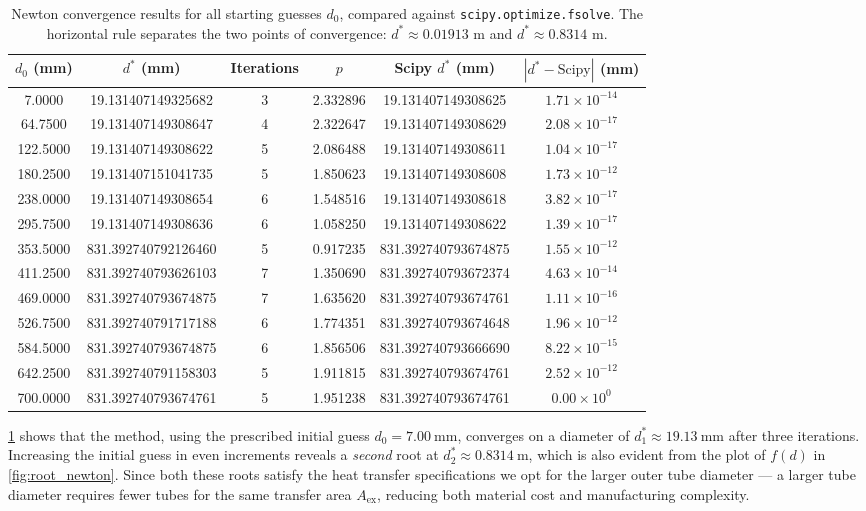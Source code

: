 \documentclass[11pt, a4paper]{article}
\theoremstyle{definition}
\begin{document}
\begin{table}[h!]
\small
\centering
\begin{tabular}{cccccc}
\hline
\textbf{$d_0$ (mm)} & \textbf{$d^*$ (mm)} & \textbf{Iterations} & \textbf{$p$} & \textbf{Scipy $d^*$ (mm)} & \textbf{$|d^* - \text{Scipy}|$ (mm)} \\
\hline
  7.0000  &  19.131407149325682 & 3 & 2.332896 &  19.131407149308625 & $1.71\times 10^{-14}$ \\
 64.7500  &  19.131407149308647 & 4 & 2.322647 &  19.131407149308629 & $2.08\times 10^{-17}$ \\
122.5000  &  19.131407149308622 & 5 & 2.086488 &  19.131407149308611 & $1.04\times 10^{-17}$ \\
180.2500  &  19.131407151041735 & 5 & 1.850623 &  19.131407149308608 & $1.73\times 10^{-12}$ \\
238.0000  &  19.131407149308654 & 6 & 1.548516 &  19.131407149308618 & $3.82\times 10^{-17}$ \\
295.7500  &  19.131407149308636 & 6 & 1.058250 &  19.131407149308622 & $1.39\times 10^{-17}$ \\
\hline
353.5000  & 831.392740792126460 & 5 & 0.917235 & 831.392740793674875 & $1.55\times 10^{-12}$ \\
411.2500  & 831.392740793626103 & 7 & 1.350690 & 831.392740793672374 & $4.63\times 10^{-14}$ \\
469.0000  & 831.392740793674875 & 7 & 1.635620 & 831.392740793674761 & $1.11\times 10^{-16}$ \\
526.7500  & 831.392740791717188 & 6 & 1.774351 & 831.392740793674648 & $1.96\times 10^{-12}$ \\
584.5000  & 831.392740793674875 & 6 & 1.856506 & 831.392740793666690 & $8.22\times 10^{-15}$ \\
642.2500  & 831.392740791158303 & 5 & 1.911815 & 831.392740793674761 & $2.52\times 10^{-12}$ \\
700.0000  & 831.392740793674761 & 5 & 1.951238 & 831.392740793674761 & $0.00\times 10^{0}$ \\
\hline
\end{tabular}
\caption{Newton convergence results for all starting guesses $d_0$,
compared against \texttt{scipy.optimize.fsolve}. The horizontal rule separates
the two points of convergence: $d^* \approx 0.01913$ m and $d^* \approx 0.8314$ m.}
\label{tab:newton_results}
\end{table}

\cref{tab:newton_results} shows that the method, using the prescribed initial
guess $d_0 = 7.00\ \mathrm{mm}$, converges on a diameter of
$d_1^* \approx 19.13\ \mathrm{mm}$ after three iterations. Increasing the
initial guess in even increments reveals a \textit{second} root at
$d_2^* \approx 0.8314\ \mathrm{m}$, which is also evident from the plot of
$f(d)$ in \cref{fig:root_newton}. Since both these roots satisfy the heat transfer
specifications we opt for the larger outer tube diameter --- a larger tube diameter requires
fewer tubes for the same transfer area $A_\mathrm{ex}$, reducing both
material cost and manufacturing complexity.
\end{document}
